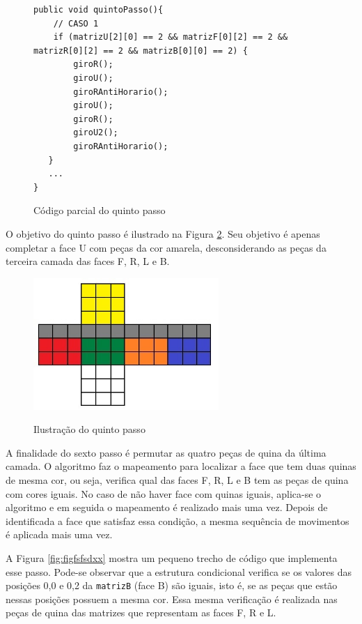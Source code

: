 \begin{figure}[!htb]
\begin{lstlisting}
public void quintoPasso(){
    // CASO 1
    if (matrizU[2][0] == 2 && matrizF[0][2] == 2 && matrizR[0][2] == 2 && matrizB[0][0] == 2) {
        giroR();
        giroU();
        giroRAntiHorario();
        giroU();
        giroR();
        giroU2();
        giroRAntiHorario();
   }
   ...
}
\end{lstlisting}
\caption{Código parcial do quinto passo}
\label{fig:figcodpasso5}
\end{figure}


O objetivo do quinto passo é ilustrado na Figura \ref{fig:quintoPasso}. Seu objetivo é apenas completar a face U com peças da cor amarela, desconsiderando as peças da terceira camada das faces F, R, L e B.  


\begin{figure}[!htb]
    \centering
    {
        \includegraphics[height=5cm]{imagens/quintopasso.jpg}
        \label{figFront}
    }
    
\caption{Ilustração do quinto passo}
\label{fig:quintoPasso}
\end{figure}


A finalidade do sexto passo é permutar as quatro peças de quina da última camada. O algoritmo faz o mapeamento para localizar a face que tem duas quinas de mesma cor, ou seja, verifica qual das faces F, R, L e B tem as peças de quina com cores iguais. No caso de não haver face com quinas iguais, aplica-se o algoritmo e em seguida o mapeamento é realizado mais uma vez. Depois de identificada a face que satisfaz essa condição, a mesma sequência de movimentos é aplicada mais uma vez. 

A Figura \ref{fig:figfsfsdxx} mostra um pequeno trecho de código que implementa esse passo. Pode-se observar que a estrutura condicional verifica se os valores das posições 0,0 e 0,2 da {\tt matrizB} (face B) são iguais, isto é, se as peças que estão nessas posições possuem a mesma cor. Essa mesma verificação é realizada nas peças de quina das matrizes que representam as faces F, R e L.




